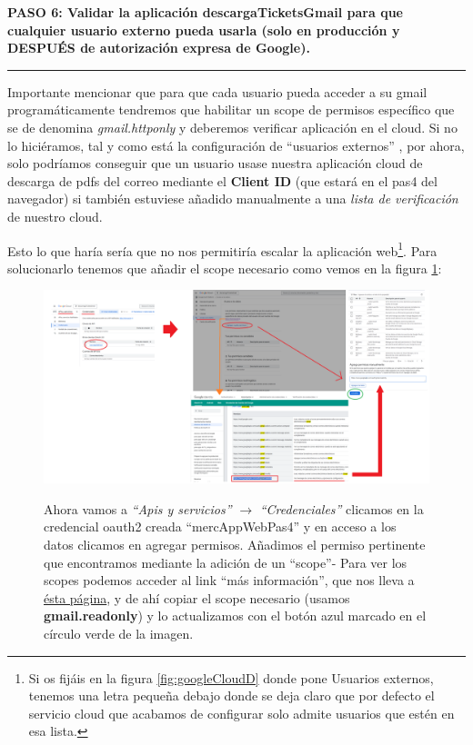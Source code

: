 \documentclass[a4paper,12pt]{report}
\begin{document}
	
	
	
	\noindent \textbf{PASO 6: Validar la aplicación descargaTicketsGmail para que cualquier usuario externo pueda usarla (solo en producción y DESPUÉS de autorización expresa de Google).}
	\vspace{.1em}
	\hrule
	\vspace{.5em}
	
	
	Importante mencionar que para que cada usuario pueda acceder a su gmail programáticamente tendremos que habilitar un scope de permisos específico que se de denomina \textit{gmail.httponly} y deberemos verificar aplicación en el cloud. Si no lo hiciéramos, tal y como está la configuración de ``usuarios externos'' , por ahora, solo podríamos conseguir que un usuario usase nuestra aplicación cloud de descarga de pdfs del correo mediante el \textbf{Client ID} (que estará en el pas4 del navegador) si también estuviese añadido manualmente a una \textit{lista de verificación} de nuestro cloud.
	
	Esto lo que haría sería que no nos permitiría escalar la aplicación web\footnote{Si os fijáis en la figura \ref{fig:googleCloudD} donde pone Usuarios externos, tenemos una letra pequeña debajo donde se deja claro que por defecto el servicio cloud que acabamos de configurar solo admite usuarios que estén en esa lista.}. Para solucionarlo tenemos que añadir el scope necesario como vemos en la figura \ref{fig:googleCloudG}:
	
	\FloatBarrier
	\setlength{\belowcaptionskip}{3pt}
	\begin{figure}[H]
		\centering
		\caption{Ahora vamos a \textit{``Apis y servicios''} $\rightarrow$ \textit{``Credenciales''} clicamos en la credencial oauth2 creada ``mercAppWebPas4'' y en acceso a los datos clicamos en agregar permisos. Añadimos el permiso pertinente que encontramos mediante la adición de un ``scope''- Para ver los scopes podemos acceder al link ``más información'', que nos lleva a \href{https://developers.google.com/identity/protocols/oauth2/scopes?hl=es_419}{ésta página}, y de ahí copiar el scope necesario (usamos \textbf{gmail.readonly}) y lo actualizamos con el botón azul marcado en el círculo verde de la imagen.}
		\includegraphics[width=1\linewidth]{img/googleCloudG}
		\label{fig:googleCloudG}
	\end{figure}
	\FloatBarrier
	
\end{document}
